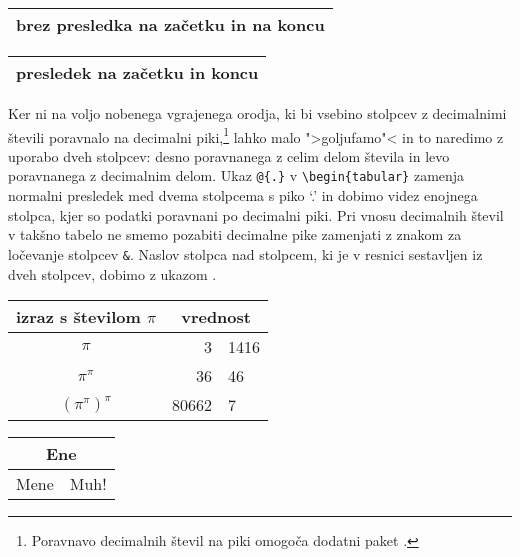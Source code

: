 \begin{example}
\begin{tabular}{@{} l @{}}
\hline 
brez presledka 
na začetku in na koncu\\
\hline
\end{tabular}
\end{example}

\begin{example}
\begin{tabular}{l}
\hline
presledek na začetku in koncu\\
\hline
\end{tabular}
\end{example}

%
%

 Ker ni na voljo nobenega vgrajenega orodja,
ki bi vsebino stolpcev z decimalnimi števili poravnalo na decimalni piki,\footnote{Poravnavo decimalnih števil na piki omogoča
dodatni paket .}
lahko malo ">goljufamo"< in to naredimo z uporabo dveh stolpcev: desno poravnanega z celim delom števila in 
levo poravnanega z decimalnim delom. Ukaz \verb|@{.}| v \verb|\begin{tabular}| zamenja 
normalni presledek med dvema stolpcema s piko `.' in dobimo videz enojnega stolpca, kjer so podatki
poravnani po decimalni piki. Pri vnosu decimalnih števil v takšno tabelo ne smemo pozabiti
decimalne pike zamenjati z znakom za ločevanje stolpcev \verb|&|. Naslov stolpca nad stolpcem, ki je v resnici
sestavljen iz dveh stolpcev, dobimo z ukazom .
 
\begin{example}
\begin{tabular}{c r @{.} l}
izraz s številom $\pi$       &
\multicolumn{2}{c}{vrednost} \\
\hline
$\pi$               & 3&1416  \\
$\pi^{\pi}$         & 36&46   \\
$(\pi^{\pi})^{\pi}$ & 80662&7 \\
\end{tabular}
\end{example}


\begin{example}
\begin{tabular}{|c|c|}
\hline
\multicolumn{2}{|c|}{Ene} \\
\hline
Mene & Muh! \\
\hline
\end{tabular}
\end{example}

